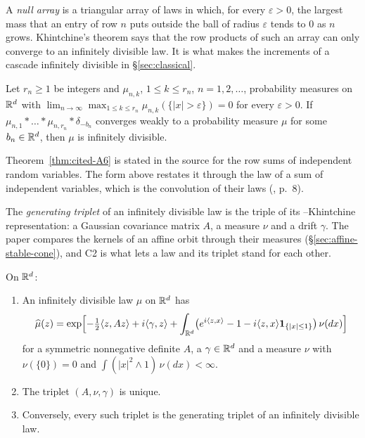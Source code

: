 A \emph{null array} is a triangular array of laws in which, for every $\varepsilon > 0$, the largest
mass that an entry of row $n$ puts outside the ball of radius $\varepsilon$ tends to $0$ as $n$ grows. Khintchine's theorem says that the row products of such an array can
only converge to an infinitely divisible law. It is what makes the increments of a cascade
infinitely divisible in \S\ref{sec:classical}.

\begin{theorem}\label{thm:cited-A6}
Let $r_n \ge 1$ be integers and $\mu_{n,k}$, $1 \le k \le r_n$, $n = 1, 2, \dots$, probability
measures on $\mathbb{R}^d$ with $\lim_{n\to\infty}\max_{1\le k\le r_n}\mu_{n,k}(\{|x| > \varepsilon\}) = 0$ for every
$\varepsilon > 0$. If $\mu_{n,1} * \dots * \mu_{n,r_n} * \delta_{-b_n}$ converges weakly to a
probability measure $\mu$ for some $b_n \in \mathbb{R}^d$, then $\mu$ is infinitely divisible.
\end{theorem}

Theorem~\ref{thm:cited-A6} is stated in the source for the row sums of independent random
variables. The form above restates it through the law of a sum of independent variables, which is
the convolution of their laws (, p.~8).

The \emph{generating triplet} of an infinitely divisible law is the triple of its
\Levy--Khintchine representation: a Gaussian covariance matrix $A$, a \Levy{} measure $\nu$ and a
drift $\gamma$. The paper compares the kernels of an affine orbit through their \Levy{} measures
(\S\ref{sec:affine-stable-cone}), and C2 is what lets a law and its triplet stand for each other.

\begin{theorem}\label{thm:cited-A3}
On $\mathbb{R}^d$:
\begin{enumerate}
\item[(i)] An infinitely divisible law $\mu$ on $\mathbb{R}^d$ has
\[
  \widehat\mu(z) = \exp\Bigl[-\tfrac12\langle z, Az\rangle + i\langle\gamma, z\rangle
   + \int_{\mathbb{R}^d}\bigl(e^{i\langle z,x\rangle} - 1 - i\langle z,x\rangle\mathbf{1}_{\{|x| \le 1\}}\bigr)\,
     \nu(dx)\Bigr]
\]
for a symmetric nonnegative definite $A$, a $\gamma \in \mathbb{R}^d$ and a measure $\nu$ with
$\nu(\{0\}) = 0$ and $\int(|x|^2 \wedge 1)\,\nu(dx) < \infty$.
\item[(ii)] The triplet $(A, \nu, \gamma)$ is unique.
\item[(iii)] Conversely, every such triplet is the generating triplet of an infinitely divisible
law.
\end{enumerate}
\end{theorem}

